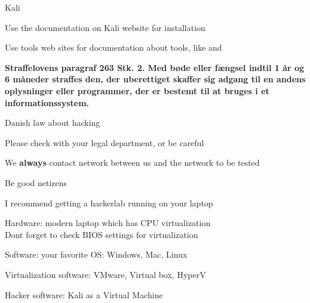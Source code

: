 \documentclass[Screen16to9,17pt]{foils}
\begin{document}




\begin{list1}
\item Kali 
\item Use the documentation on Kali website for installation
\item Use tools web sites for documentation about tools, like  and 
\end{list1}



{\bfseries Straffelovens paragraf 263 Stk. 2. Med bøde eller fængsel indtil 1 år og 6 måneder straffes den, der uberettiget skaffer sig adgang til en andens oplysninger eller programmer, der er bestemt til at bruges i et informationssystem. }

\begin{list2}
\item Danish law about hacking
\item Please check with your legal department, or be careful
\item We {\bf always} contact network between us and the network to be tested
\item Be good netizens
\end{list2}



\begin{list2}
\item I recommend getting a hackerlab running on your laptop
\item Hardware: modern laptop which has CPU virtualization\\
Dont forget to check BIOS settings for virtualization
\item Software: your favorite OS: Windows, Mac, Linux
\item Virtualization software: VMware, Virtual box, HyperV
\item Hacker software: Kali as a Virtual Machine 
\end{list2}
\end{document}
